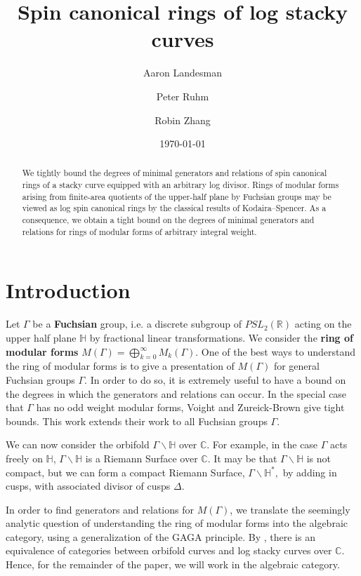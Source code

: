 \documentclass{amsart}
\title{Spin canonical rings of log stacky curves}
\author{Aaron Landesman}
\author{Peter Ruhm}
\author{Robin Zhang}
\date{\today}
\theoremstyle{plain}
\theoremstyle{definition}
\theoremstyle{remark}
\numberwithin{equation}{section}
\newcommand\BH{{\mathbb H}}
\newcommand\BC{{\mathbb C}}
\newcommand\BR{{\mathbb R}}
\begin{document}
\begin{abstract}
 	We tightly bound the degrees of minimal
	generators and relations of spin canonical rings of a stacky
	curve equipped with an arbitrary log divisor.  Rings of modular forms arising from finite-area
	quotients of the upper-half plane by Fuchsian groups may be
	viewed as log spin canonical rings by the classical
	results of Kodaira--Spencer. As a consequence, 
	we obtain a tight bound on the degrees of minimal generators and relations  		
	for rings of modular forms of arbitrary integral weight.
\end{abstract}

\maketitle



\section{Introduction}
Let $\Gamma$ be a {\bf Fuchsian} group, i.e. a discrete subgroup of
$PSL_2(\BR)$ acting on the upper half plane $\BH$ by fractional
linear transformations. We consider the {\bf ring of modular forms}
$M(\Gamma) = \bigoplus_{k = 0}^\infty M_k(\Gamma)$. One of the best
ways to understand the ring of modular forms is to give a
presentation of $M(\Gamma)$ for general Fuchsian groups $\Gamma$. 
In order to do so, it is extremely useful to have a bound on the
degrees in which the generators and relations can occur. In the
special case that $\Gamma$ has no odd weight modular forms, Voight
and Zureick-Brown \cite[Chapters 7-9]{vzb:stacky} give tight bounds.
 This work extends their work to all Fuchsian groups $\Gamma$.

We can now consider the orbifold $\Gamma \backslash \BH$ over $\BC$.
For example, in the case $\Gamma$ acts freely on $\BH$, $\Gamma
\backslash \BH$ is a Riemann Surface over $\BC$. It may be
that $\Gamma \backslash \BH$ is not compact, but we can form a
compact Riemann Surface, $\Gamma \backslash \BH^*,$ by adding in
cusps, with associated divisor of cusps $\Delta$.

In order to find generators and relations for $M(\Gamma)$, we
translate the seemingly analytic question of understanding the ring
of modular forms into the algebraic category, using a
generalization of the GAGA principle. By \cite[Proposition 6.1.5]
{vzb:stacky}, there is an equivalence of categories between orbifold
curves and log stacky curves over $\BC$. Hence, for the remainder
of the paper, we will work in the algebraic category.
\end{document}
